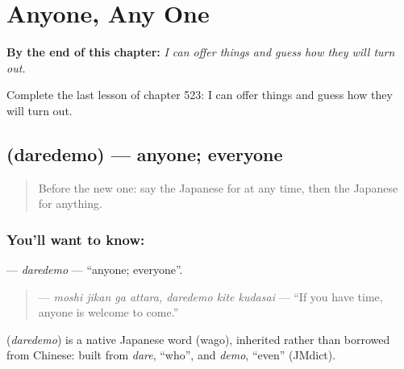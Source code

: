 
\chapter{Anyone, Any One}
\label{ch:ja-anyone-any-one}

\begin{chapteropening}
\textbf{By the end of this chapter:} \emph{I can offer things and guess how they will turn out.}

Complete the last lesson of chapter 523: I can offer things and guess how they will turn out.
\end{chapteropening}

\section[\texorpdfstring{\ja{だれでも} (daredemo)}{だれでも (daredemo)}]{ (daredemo) — anyone; everyone}

\label{lesson:JA-C523-daredemo}



\begin{quote}
Before the new one: say the Japanese for at any time, then the Japanese for anything.
\end{quote}

\subsection*{You'll want to know: }
\textbf{} — \emph{daredemo} — \textquotedblleft{}anyone; everyone\textquotedblright{}.

\begin{quote}
\textbf{    } — \emph{moshi jikan ga attara, daredemo kite kudasai} — \textquotedblleft{}If you have time, anyone is welcome to come.\textquotedblright{}
\end{quote}

\begin{cousinweb}
\textbf{} (\emph{daredemo}) is a native Japanese word (wago), inherited rather than borrowed from Chinese: built from \emph{dare}, \textquotedblleft{}who\textquotedblright{}, and \emph{demo}, \textquotedblleft{}even\textquotedblright{} (JMdict).
\end{cousinweb}

